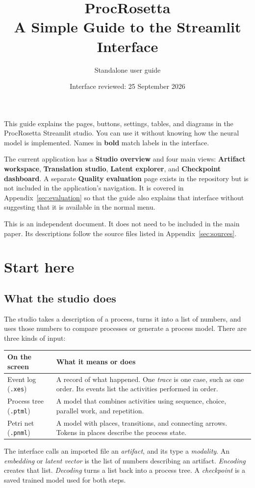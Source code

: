 \documentclass[11pt,a4paper]{article}
\title{ProcRosetta\\A Simple Guide to the Streamlit Interface}
\author{Standalone user guide}
\date{Interface reviewed: 25 September 2026}
\makeatletter
\newcommand{\ui}[1]{\textbf{#1}}
\newcommand{\code}[1]{\nolinkurl{#1}}
\newenvironment{controls}{%
  \small\begin{longtable}{@{}>{\raggedright\arraybackslash}p{.34\linewidth}
    >{\raggedright\arraybackslash}p{.62\linewidth}@{}}
  \toprule\textbf{On the screen} & \textbf{What it means or does}\\\midrule\endhead
  \bottomrule\endfoot
}{\end{longtable}\normalsize}
\makeatother
\begin{document}
\maketitle

This guide explains the pages, buttons, settings, tables, and diagrams in the
ProcRosetta Streamlit studio. You can use it without knowing how the neural
model is implemented. Names in \ui{bold} match labels in the interface.

The current application has a \ui{Studio overview} and four main views:
\ui{Artifact workspace}, \ui{Translation studio}, \ui{Latent explorer}, and
\ui{Checkpoint dashboard}. A separate \ui{Quality evaluation} page exists in
the repository but is not included in the application's navigation. It is
covered in Appendix~\ref{sec:evaluation} so that the guide also explains that
interface without suggesting that it is available in the normal menu.

This is an independent document. It does not need to be included in the main
paper. Its descriptions follow the source files listed in
Appendix~\ref{sec:sources}.

\tableofcontents
\newpage

\section{Start here}
\label{sec:start}

\subsection{What the studio does}
The studio takes a description of a process, turns it into a list of numbers,
and uses those numbers to compare processes or generate a process model.
There are three kinds of input:

\begin{controls}
Event log (\code{.xes}) & A record of what happened. One \emph{trace} is one
case, such as one order. Its events list the activities performed in order.\\
Process tree (\code{.ptml}) & A model that combines activities using sequence,
choice, parallel work, and repetition.\\
Petri net (\code{.pnml}) & A model with places, transitions, and connecting
arrows. Tokens in places describe the process state.\\
\end{controls}

The interface calls an imported file an \emph{artifact}, and its type a
\emph{modality}. An \emph{embedding} or \emph{latent vector} is the list of
numbers describing an artifact. \emph{Encoding} creates that list.
\emph{Decoding} turns a list back into a process tree. A \emph{checkpoint}
is a saved trained model used for both steps.
\end{document}
